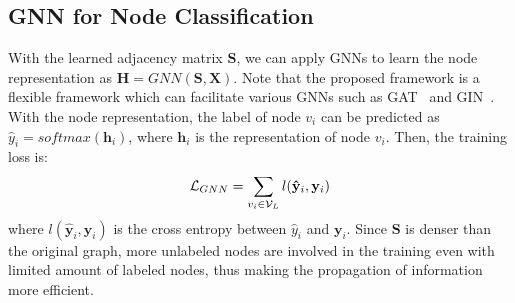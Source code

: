 \subsection{GNN for Node Classification}
With the learned adjacency matrix $\mathbf{S}$, we can apply GNNs to learn the node representation as $\mathbf{H} = GNN(\mathbf{S}, \mathbf{X})$. 
Note that the proposed framework is a flexible framework which can facilitate various GNNs such as GAT~\cite{velivckovic2017graph} and GIN~\cite{xu2018powerful}. With the node representation, the label of node $v_i$ can be predicted as
$\hat{y}_i = softmax(\mathbf{h}_i)$, where $\mathbf{h}_i$ is the representation of node $v_i$. Then, the training loss is:
\begin{equation}
\small
    \mathcal{L}_{GNN} = \sum_{v_i \in \mathcal{V}_L} l(\mathbf{\hat{y}}_i, \mathbf{y}_i)
    \label{eq:GNN_dense}
\end{equation}
where $l(\mathbf{\hat{y}}_i, \mathbf{y}_i)$ is the cross entropy between $\hat{y}_i$ and $\mathbf{y}_i$. Since $\mathbf{S}$ is denser than the original graph, more unlabeled nodes are involved in the training even with limited amount of labeled nodes, thus making the propagation of information more efficient.

